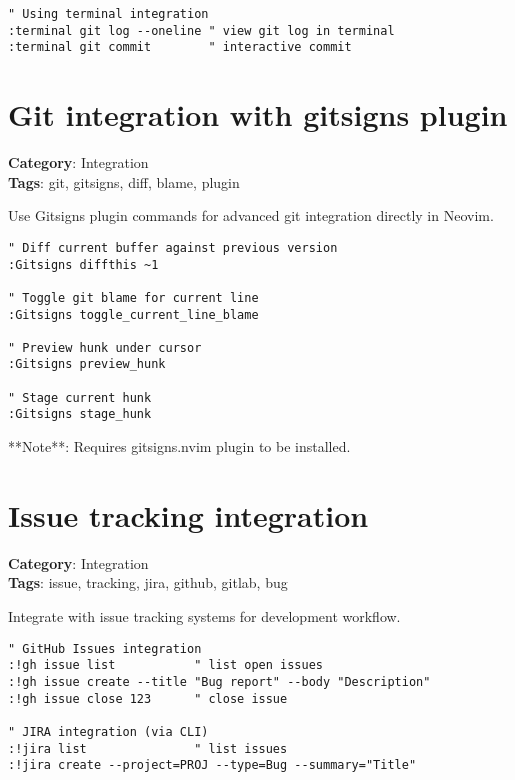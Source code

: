 {{{{{{\begin{Exa*}{}
\begin{Verbatim}[fontsize=\footnotesize, breaklines, breakanywhere]
" Using terminal integration
:terminal git log --oneline " view git log in terminal
:terminal git commit        " interactive commit
\end{Verbatim}
\end{Exa*}

\section{Git integration with gitsigns plugin}

\textbf{Category}: Integration\\ \textbf{Tags}: git, gitsigns, diff, blame, plugin
\vspace{0.5cm}

Use Gitsigns plugin commands for advanced git integration directly in Neovim.

\begin{Exa*}{}
\begin{Verbatim}[fontsize=\footnotesize, breaklines, breakanywhere]
" Diff current buffer against previous version
:Gitsigns diffthis ~1

" Toggle git blame for current line
:Gitsigns toggle_current_line_blame

" Preview hunk under cursor
:Gitsigns preview_hunk

" Stage current hunk
:Gitsigns stage_hunk
\end{Verbatim}
\end{Exa*}

**Note**: Requires gitsigns.nvim plugin to be installed.

\section{Issue tracking integration}

\textbf{Category}: Integration\\ \textbf{Tags}: issue, tracking, jira, github, gitlab, bug
\vspace{0.5cm}

Integrate with issue tracking systems for development workflow.

\begin{Exa*}{}
\begin{Verbatim}[fontsize=\footnotesize, breaklines, breakanywhere]
" GitHub Issues integration
:!gh issue list           " list open issues
:!gh issue create --title "Bug report" --body "Description"
:!gh issue close 123      " close issue

" JIRA integration (via CLI)
:!jira list               " list issues
:!jira create --project=PROJ --type=Bug --summary="Title"


\end{Verbatim}
\end{Exa*}}}}}}}
